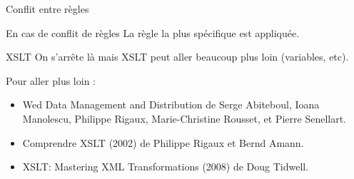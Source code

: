 \begin{frame}{Conflit entre règles}

\begin{small}
\begin{center}
\begin{minipage}{\textwidth}

\end{minipage}
\end{center}
\end{small}

\begin{block}{En cas de conflit de règles}
La règle la plus spécifique est appliquée.
\end{block}


\framebreak

\begin{center}
\begin{minipage}{0.9\textwidth}

\end{minipage}
\end{center}

\end{frame}


\begin{frame}{XSLT}
On s'arr\^ete l\`a mais XSLT peut aller beaucoup plus loin (variables, etc).

\bigskip

Pour aller plus loin :
\begin{itemize}
\item \cite{WDMD} Wed Data Management and Distribution de Serge Abiteboul, Ioana Manolescu, Philippe Rigaux, Marie-Christine Rousset, et Pierre Senellart.
\item \cite{RA02} Comprendre XSLT (2002) de Philippe Rigaux et Bernd Amann.
\item \cite{Tid08} XSLT: Mastering XML Transformations (2008) de Doug Tidwell.
\end{itemize}

\end{frame}

